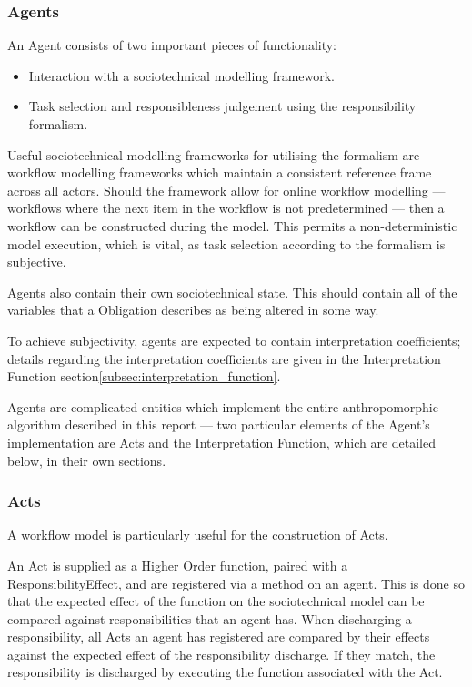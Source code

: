 \subsubsection{Agents}  %
An Agent consists of two important pieces of functionality:

\begin{itemize}
    \item Interaction with a sociotechnical modelling framework.
    \item Task selection and responsibleness judgement using the responsibility formalism.
\end{itemize}

Useful sociotechnical modelling frameworks for utilising the formalism are workflow modelling frameworks which maintain a consistent reference frame across all actors. Should the framework allow for online workflow modelling --- workflows where the next item in the workflow is not predetermined --- then a workflow can be constructed during the model. This permits a non-deterministic model execution, which is vital, as task selection according to the formalism is subjective.\par

Agents also contain their own sociotechnical state. This should contain all of the variables that a Obligation describes as being altered in some way.\par

To achieve subjectivity, agents are expected to contain interpretation coefficients; details regarding the interpretation coefficients are given in the Interpretation Function section\cref{subsec:interpretation_function}.

Agents are complicated entities which implement the entire anthropomorphic algorithm described in this report --- two particular elements of the Agent's implementation are Acts and the Interpretation Function, which are detailed below, in their own sections.

\subsubsection{Acts}
A workflow model is particularly useful for the construction of Acts.\par

An Act is supplied as a Higher Order function, paired with a ResponsibilityEffect, and are registered via a method on an agent. This is done so that the expected effect of the function on the sociotechnical model can be compared against responsibilities that an agent has. When discharging a responsibility, all Acts an agent has registered are compared by their effects against the expected effect of the responsibility discharge. If they match, the responsibility is discharged by executing the function associated with the Act.\par

